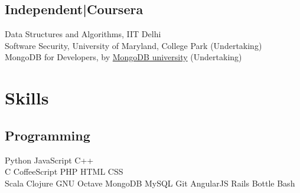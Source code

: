 \documentclass[]{deedy-resume-openfont}
\begin{document}
\begin{minipage}[t]{0.33\textwidth}
\subsection{Independent|Coursera}
Data Structures and Algorithms, IIT Delhi\\
Software Security, University of Maryland, College Park (Undertaking)\\
MongoDB for Developers, by \href{https://university.mongodb.com/courses/M101P/about}{MongoDB university} (Undertaking)
\sectionsep


\section{Skills}
\subsection{Programming}
Python \textbullet{} JavaScript \textbullet{} C++ \\
C \textbullet{} CoffeeScript \textbullet{} PHP \textbullet{} HTML \textbullet{}  CSS \\
Scala \textbullet{} Clojure \textbullet{} GNU Octave \textbullet{} MongoDB \textbullet{} MySQL \textbullet{} Git \textbullet{} AngularJS \textbullet{} Rails \textbullet{} Bottle \textbullet{} Bash
\sectionsep

%
%

\end{minipage} 
\hfill
\end{document}
